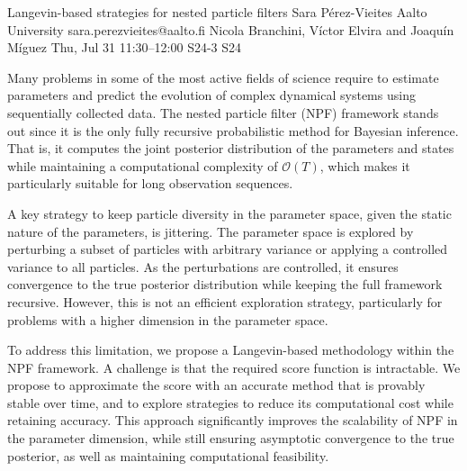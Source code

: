 \begin{talk}
  {Langevin-based strategies for nested particle filters}%
  {Sara P\'erez-Vieites}%
  {Aalto University}%
  {sara.perezvieites@aalto.fi}%
  {Nicola Branchini, V\'ictor Elvira and Joaqu\'in M\'iguez}%
  {}%
  {Thu, Jul 31 11:30--12:00}%
  {S24-3}%
  {S24}%
  
    
   
Many problems in some of the most active fields of science require to estimate parameters and predict the evolution of complex dynamical systems using sequentially collected data. The nested particle filter (NPF) framework stands out since it is the only fully recursive probabilistic method for Bayesian inference. That is, it computes the joint posterior distribution of the parameters and states while maintaining a computational complexity of $\mathcal{O}(T)$, which makes it particularly suitable for long observation sequences. 

A key strategy to keep particle diversity in the parameter space, given the static nature of the parameters, is jittering. The parameter space is explored by perturbing a subset of particles with arbitrary variance or applying a controlled variance to all particles. As the perturbations are controlled, it ensures convergence to the true posterior distribution while keeping the full framework recursive. However, this is not an efficient exploration strategy, particularly for problems with a higher dimension in the parameter space.

To address this limitation, we propose a Langevin-based methodology within the NPF framework. A challenge is that the required score function is intractable. We propose to approximate the score with an accurate method that is provably stable over time, and to explore strategies to reduce its computational cost while retaining accuracy.
This approach significantly improves the scalability of NPF in the parameter dimension, while still ensuring asymptotic convergence to the true posterior, as well as maintaining computational feasibility.

\medskip




\end{talk}
